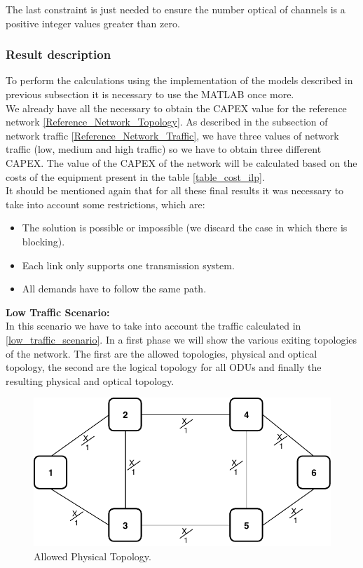 The last constraint is just needed to ensure the number optical of channels is a positive integer values greater than zero.\\


\subsubsection{Result description}

To perform the calculations using the implementation of the models described in previous subsection it is necessary to use the MATLAB once more. \\
We already have all the necessary to obtain the CAPEX value for the reference network \ref{Reference_Network_Topology}. As described in the subsection of network traffic \ref{Reference_Network_Traffic}, we have three values of network traffic (low, medium and high traffic) so we have to obtain three different CAPEX.
The value of the CAPEX of the network will be calculated based on the costs of the equipment present in the table \ref{table_cost_ilp}.\\

It should be mentioned again that for all these final results it was necessary to take into account some restrictions, which are:
\begin{itemize}
  \item The solution is possible or impossible (we discard the case in which there is blocking).
  \item Each link only supports one transmission system.
  \item All demands have to follow the same path.
\end{itemize}

\vspace{17pt}
\textbf{Low Traffic Scenario:}\\

In this scenario we have to take into account the traffic calculated in \ref{low_traffic_scenario}. In a first phase we will show the various exiting topologies of the network. The first are the allowed topologies, physical and optical topology, the second are the logical topology for all ODUs and finally the resulting physical and optical topology.\\

\begin{figure}[h!]
\centering
\includegraphics[width=12cm]{sdf/ilp/opaque_protection/figures/allowed_physical_topology}
\caption{Allowed Physical Topology.}
\label{allowed_physical_protectionlow}
\end{figure}

